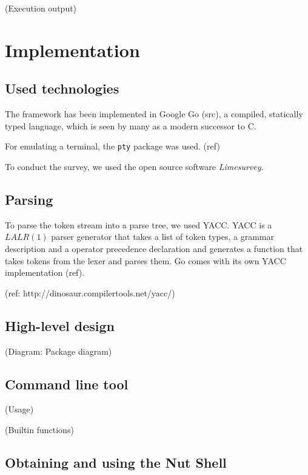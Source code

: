 \documentclass[paper=a4,twoside,abstract=on,cleardoublepage=empty,numbers=noenddot,toc=bib,11pt,appendixprefix=true]{scrreprt}
\begin{document}


(Execution output)

\chapter{Implementation}
\label{sec:implementation}

\section{Used technologies}

The framework has been implemented in Google Go (src), a compiled, statically typed language, which is seen by many as a modern successor to C.

For emulating a terminal, the \texttt{pty} package was used.
(ref)

To conduct the survey, we used the open source software \emph{Limesurvey}.

\section{Parsing}

To parse the token stream into a parse tree, we used \textsc{YACC}. \textsc{YACC} is a $LALR(1)$ parser generator that takes a list of token types, a grammar description and a operator precedence declaration and generates a function that takes tokens from the lexer and parses them. Go comes with its own YACC implementation (ref).

(ref: http://dinosaur.compilertools.net/yacc/)

\section{High-level design}

(Diagram: Package diagram)

\section{Command line tool}

(Usage)

(Builtin functions)

\section{Obtaining and using the Nut Shell}
\end{document}
